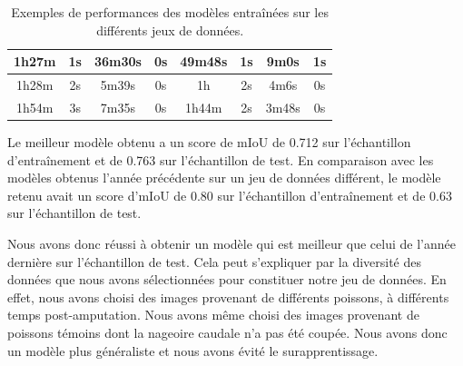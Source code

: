 \documentclass[a4paper,12pt]{report}
\begin{document}
\begin{table}[!ht]
\begin{tabular}{|c|c|c|c|c|c|c|c|}
        1h27m                                        & 1s                                         & 36m30s                                       & 0s                                                  & 49m48s         & 1s            & 9m0s                  & 1s                    \\\hline
        1h28m                                        & 2s                                         & 5m39s                                        & 0s                                                  & 1h             & 2s            & 4m6s                  & 0s                    \\\hline
        1h54m                                        & 3s                                         & 7m35s                                        & 0s                                                  & 1h44m          & 2s            & 3m48s                 & 0s                    \\\hline
    \end{tabular}
    \caption{Exemples de performances des modèles entraînées sur les différents jeux de données.}
    \label{mac:dataset}
\end{table}

Le meilleur modèle obtenu a un score de mIoU de 0.712 sur l'échantillon d'entraînement et de 0.763 sur l'échantillon de test. En comparaison avec les modèles obtenus l'année précédente sur un jeu de données différent, le modèle retenu avait un score d'mIoU de 0.80 sur l'échantillon d'entraînement et de 0.63 sur l'échantillon de test.

Nous avons donc réussi à obtenir un modèle qui est meilleur que celui de l'année dernière sur l'échantillon de test. Cela peut s'expliquer par la diversité des données que nous avons sélectionnées pour constituer notre jeu de données. En effet, nous avons choisi des images provenant de différents poissons, à différents temps post-amputation. Nous avons même choisi des images provenant de poissons témoins dont la nageoire caudale n'a pas été coupée. Nous avons donc un modèle plus généraliste et nous avons évité le surapprentissage.
\end{document}
